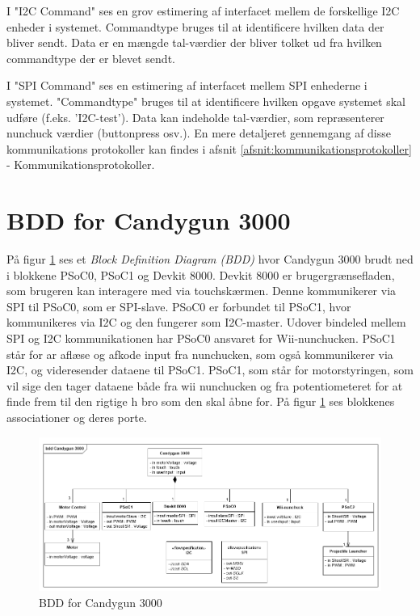 I "I2C Command" ses en grov estimering af interfacet mellem de forskellige I2C enheder i systemet. Commandtype bruges til at identificere hvilken data der bliver sendt. Data er en mængde tal-værdier der bliver tolket ud fra hvilken commandtype der er blevet sendt.

I "SPI Command" ses en estimering af interfacet mellem SPI enhederne i systemet. "Commandtype" bruges til at identificere hvilken opgave systemet skal udføre (f.eks. 'I2C-test'). Data kan indeholde tal-værdier, som repræsenterer nunchuck værdier (buttonpress osv.). 
En mere detaljeret gennemgang af disse kommunikations protokoller kan findes i afsnit \ref{afsnit:kommunikationsprotokoller} - Kommunikationsprotokoller.

\section{BDD for Candygun 3000}
På figur \ref{fig:BDD} ses et \textit{Block Definition Diagram (BDD)} hvor Candygun 3000 brudt ned i blokkene PSoC0, PSoC1 og Devkit 8000. Devkit 8000 er brugergrænsefladen, som brugeren kan interagere med via touchskærmen. Denne kommunikerer via SPI til PSoC0, som er SPI-slave. PSoC0 er forbundet til PSoC1, hvor kommunikeres via I2C og den fungerer som I2C-master. Udover bindeled mellem SPI og I2C kommunikationen har  PSoC0 ansvaret for Wii-nunchucken. PSoC1 står for ar aflæse og afkode input fra nunchucken, som også kommunikerer via I2C, og videresender dataene til PSoC1. PSoC1, som står for motorstyringen, som vil sige den tager dataene både fra wii nunchucken og fra potentiometeret  for at finde frem til den rigtige h bro som den skal åbne for. På figur \ref{fig:BDD} ses blokkenes associationer og deres porte.  

\begin{figure}[H]
	\centering
	\includegraphics[width= \textwidth]{Systemarkitektur/images/BDD_overordnet.png}
	\caption{BDD for Candygun 3000}
	\label{fig:BDD}
\end{figure}


